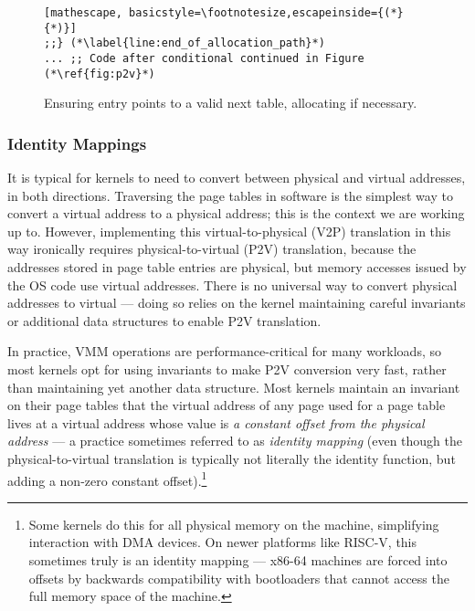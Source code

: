\begin{figure}
\begin{lstlisting}[mathescape, basicstyle=\footnotesize,escapeinside={(*}{*)}]
;;} (*\label{line:end_of_allocation_path}*)
... ;; Code after conditional continued in Figure (*\ref{fig:p2v}*)
\end{lstlisting}
\vspace{-1em}
\caption{Ensuring \textsf{entry} points to a valid next table, allocating if necessary.}
\label{fig:calltopteinitialize}
\end{figure}

\subsubsection{Identity Mappings}
\label{subsec:identitymappings}
It is typical for kernels to need to convert between physical and virtual addresses, in both directions.
Traversing the page tables in software is the simplest way to convert a virtual address to a physical address; this is the context we are working up to.
However, implementing this virtual-to-physical (V2P) translation in this way ironically requires physical-to-virtual (P2V) translation,
because the addresses stored in page table entries are physical, but memory accesses issued by the OS code use virtual addresses.
There is no universal way to convert physical addresses to virtual --- doing so relies on the kernel maintaining careful invariants or
additional data structures to enable P2V translation.

In practice, VMM operations are performance-critical for many workloads, so most kernels opt for using invariants to make P2V conversion very fast,
rather than maintaining yet another data structure.
Most kernels maintain an invariant on their page tables that the virtual address of any page used for a page table lives at a virtual address
whose value is \emph{a constant offset from the physical address} --- a practice sometimes referred to as \emph{identity mapping} 
(even though the physical-to-virtual translation
is typically not literally the identity function, but adding a non-zero constant offset).\footnote{Some kernels do this for all physical memory on the machine, simplifying interaction
with DMA devices.
On newer platforms like RISC-V, this sometimes truly is an identity mapping ---
x86-64 machines are forced into offsets by backwards compatibility with bootloaders that cannot access the full memory space of the
machine.
}

